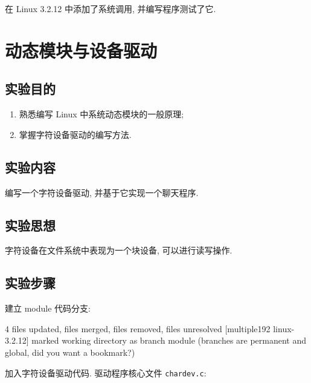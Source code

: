 \documentclass[11pt]{report}
\begin{document}
        在 Linux 3.2.12 中添加了系统调用, 并编写程序测试了它.

\chapter{动态模块与设备驱动}

    \section{实验目的}

        \begin{enumerate}
            \item 熟悉编写 Linux 中系统动态模块的一般原理;
            \item 掌握字符设备驱动的编写方法.
        \end{enumerate}

    \section{实验内容}

        编写一个字符设备驱动, 并基于它实现一个聊天程序.

    \section{实验思想}

        字符设备在文件系统中表现为一个块设备, 可以进行读写操作.

    \section{实验步骤}

        建立 module 代码分支:
        
\begin{console}
4 files updated, files merged, files removed, files unresolved
[multiple192 linux-3.2.12]%
marked working directory as branch module
(branches are permanent and global, did you want a bookmark?)
\end{console}

            加入字符设备驱动代码. 
                驱动程序核心文件 \verb|chardev.c|:
\end{document}
